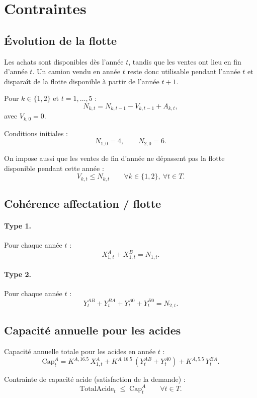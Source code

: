 \documentclass{article}
\begin{document}
\section{Contraintes}

\subsection{Évolution de la flotte}

Les achats sont disponibles dès l'année $t$, tandis que les ventes ont lieu en
fin d'année $t$. Un camion vendu en année $t$ reste donc utilisable pendant
l'année $t$ et disparaît de la flotte disponible à partir de l'année $t+1$.

Pour $k \in \{1,2\}$ et $t = 1,\dots,5$ :
\[
  N_{k,t} = N_{k,t-1} - V_{k,t-1} + A_{k,t},
\]
avec $V_{k,0}=0$.

Conditions initiales :
\[
  N_{1,0} = 4, \qquad N_{2,0} = 6.
\]

On impose aussi que les ventes de fin d'année ne dépassent pas la flotte
disponible pendant cette année :
\[
  V_{k,t} \le N_{k,t}
  \qquad \forall k \in \{1,2\},\ \forall t \in T.
\]

\subsection{Cohérence affectation / flotte}

\paragraph{Type 1.} Pour chaque année $t$ :
\[
  X^{A}_{1,t} + X^{B}_{1,t} = N_{1,t}.
\]

\paragraph{Type 2.} Pour chaque année $t$ :
\[
  Y^{AB}_t + Y^{BA}_t + Y^{A0}_t + Y^{B0}_t = N_{2,t}.
\]

\subsection{Capacité annuelle pour les acides}

Capacité annuelle totale pour les acides en année $t$ :
\[
  \text{Cap}^A_t
  =
  K^{A,16.5}\, X^{A}_{1,t}
  + K^{A,16.5}\, (Y^{AB}_t + Y^{A0}_t)
  + K^{A,5.5}\, Y^{BA}_t.
\]

Contrainte de capacité acide (satisfaction de la demande) :
\[
  \text{TotalAcide}_t \;\le\; \text{Cap}^A_t
  \qquad \forall t \in T.
\]
\end{document}
